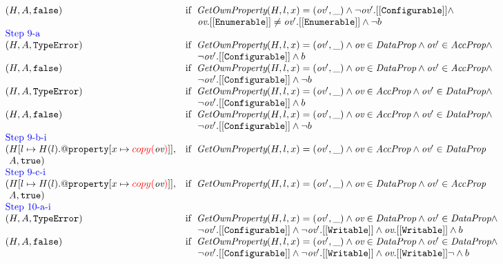 \[\begin{array}{l@{}c@{}l}
{\begin{array}{ll}
(H,A,\false)
&\ifc{\hf{GetOwnProperty}(H,l,x) = (\emph{ov}', \_) \wedge
  \neg \emph{ov}'.{\tt[[Configurable]]} \wedge}\\
&\mbox{\phantom{if \ }$\emph{ov}.{\tt[[Enumerable]]}\not=\emph{ov}'.{\tt[[Enumerable]]} \wedge \neg b$}\\
\multicolumn{2}{l}{\mbox{\inblue Step 9-a}}\\
(H,A,\te)
&\ifc{\hf{GetOwnProperty}(H,l,x) = (\emph{ov}', \_) \wedge
\emph{ov} \in \emph{DataProp} \wedge
\emph{ov}' \in \emph{AccProp} \wedge}\\
&\mbox{\phantom{if \ }$
\neg \emph{ov}'.{\tt[[Configurable]]} \wedge b$}\\
(H,A,\false)
&\ifc{\hf{GetOwnProperty}(H,l,x) = (\emph{ov}', \_) \wedge
\emph{ov} \in \emph{DataProp} \wedge
\emph{ov}' \in \emph{AccProp} \wedge}\\
&\mbox{\phantom{if \ }$
\neg \emph{ov}'.{\tt[[Configurable]]} \wedge \neg b$}\\
(H,A,\te)
&\ifc{\hf{GetOwnProperty}(H,l,x) = (\emph{ov}', \_) \wedge
\emph{ov} \in \emph{AccProp} \wedge
\emph{ov}' \in \emph{DataProp} \wedge}\\
&\mbox{\phantom{if \ }$
\neg \emph{ov}'.{\tt[[Configurable]]} \wedge b$}\\
(H,A,\false)
&\ifc{\hf{GetOwnProperty}(H,l,x) = (\emph{ov}', \_) \wedge
\emph{ov} \in \emph{AccProp} \wedge
\emph{ov}' \in \emph{DataProp} \wedge}\\
&\mbox{\phantom{if \ }$
\neg \emph{ov}'.{\tt[[Configurable]]} \wedge \neg b$}\\
\multicolumn{2}{l}{\mbox{\inblue Step 9-b-i}}\\
(H[l\mapsto H(l).{\tt@property}[x\mapsto{\inred copy(}\emph{ov}{\inred)}]], 
&\ifc{\hf{GetOwnProperty}(H,l,x) = (\emph{ov}', \_) \wedge
\emph{ov} \in \emph{AccProp} \wedge
\emph{ov}' \in \emph{DataProp}}\\
\phantom{(}A,\true)
\\
\multicolumn{2}{l}{\mbox{\inblue Step 9-c-i}}\\
(H[l\mapsto H(l).{\tt@property}[x\mapsto{\inred copy(}\emph{ov}{\inred)}]], 
&\ifc{\hf{GetOwnProperty}(H,l,x) = (\emph{ov}', \_) \wedge
\emph{ov} \in \emph{DataProp} \wedge
\emph{ov}' \in \emph{AccProp}}\\
\phantom{(}A,\true)\\
\multicolumn{2}{l}{\mbox{\inblue Step 10-a-i}}\\
(H,A,\te)
&\ifc{\hf{GetOwnProperty}(H,l,x) = (\emph{ov}', \_) \wedge
\emph{ov} \in \emph{DataProp} \wedge
\emph{ov}' \in \emph{DataProp} \wedge}\\
&\mbox{\phantom{if \ }$
\neg \emph{ov}'.{\tt[[Configurable]]} \wedge \neg\emph{ov}'.{\tt[[Writable]]} \wedge
\emph{ov}.{\tt[[Writable]]}
 \wedge b$}\\
(H,A,\false)
&\ifc{\hf{GetOwnProperty}(H,l,x) = (\emph{ov}', \_) \wedge
\emph{ov} \in \emph{DataProp} \wedge
\emph{ov}' \in \emph{DataProp} \wedge}\\
&\mbox{\phantom{if \ }$
\neg \emph{ov}'.{\tt[[Configurable]]} \wedge \neg\emph{ov}'.{\tt[[Writable]]} \wedge
\emph{ov}.{\tt[[Writable]]}
\neg \wedge b$}\\


\end{array}}
\end{array}\]
